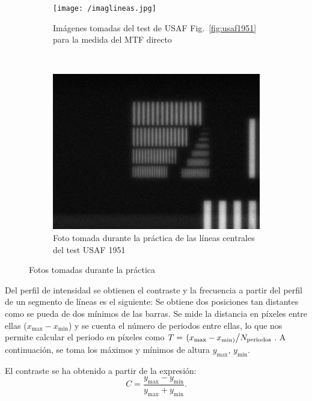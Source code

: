 \documentclass{./packages/optica-article}
\begin{document}
\begin{figure}[h]
\centering
\begin{subfigure}[t]{0.576\textwidth}\centering
	\texttt{[image: /imaglineas.jpg]}
	\caption{Imágenes tomadas del test de USAF Fig.~\ref{fig:usaf1951} para la medida del MTF directo}\label{fig:images:example}
\end{subfigure}
\,
\begin{subfigure}[t]{0.4\textwidth}\centering
	\includegraphics[width=\textwidth]{smallest_lines}
	\caption{Foto tomada durante la práctica de las líneas centrales del test USAF 1951}\label{fig:usafpic}
\end{subfigure}
\caption{Fotos tomadas durante la práctica}\label{fig:group:usaf}
\end{figure}


Del perfil de intensidad se obtienen el contraste y la frecuencia a partir del perfil de un segmento de líneas es el siguiente: Se obtiene dos posiciones tan distantes como se pueda de dos mínimos de las barras. Se mide la distancia en píxeles entre ellas ($x_{\max} - x_{\min} $) y se cuenta el número de periodos entre ellas, lo que nos permite calcular el periodo en píxeles como $T = \flatfrac{(x_{\max} - x_{\min)} }{N_{\textrm{periodos}}}$. A continuación,  se toma los máximos y mínimos de altura $y_{\max}$, $y_{\min}$.

El contraste se ha obtenido a partir de la expresión:
\nopagebreak
\begin{equation}
	C = \frac{y_{\max} - y_{\min}}{y_{\max} + y_{\min}}.
	\label{eq:contraste}
\end{equation}
\end{document}
